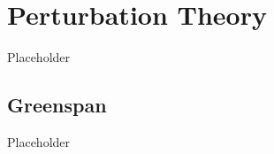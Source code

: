 \section{Perturbation Theory}
\label{sec:bg:pert}

Placeholder

\subsection{Greenspan}
\label{sec:bg:pert:greenspan}

Placeholder
